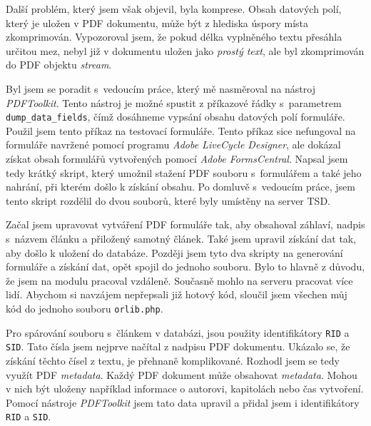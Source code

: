 \documentclass[czech,BP]{thesiskiv}
\begin{document}
Další problém, který jsem však objevil, byla komprese. Obsah datových polí, který je uložen v PDF dokumentu, může být z hlediska úspory místa zkomprimován. Vypozoroval jsem, že pokud délka vyplněného textu přesáhla určitou mez, nebyl již v dokumentu uložen jako \emph{prostý text}, ale byl zkomprimován do PDF objektu \emph{stream}. 

Byl jsem se poradit s~vedoucím práce, který mě nasměroval na nástroj \emph{PDFToolkit}. Tento nástroj je možné spustit z příkazové řádky s~parametrem \texttt{dump\_data\_fields}, čímž dosáhneme vypsání obsahu datových polí formuláře. Použil jsem tento příkaz na testovací formuláře. Tento příkaz sice nefungoval na formuláře navržené pomocí programu \emph{Adobe LiveCycle Designer}, ale dokázal získat obsah formulářů vytvořených pomocí \emph{Adobe FormsCentral}. Napsal jsem tedy krátký skript, který umožnil stažení PDF souboru s~formulářem a také jeho nahrání, při kterém došlo k získání obsahu. Po domluvě s~vedoucím práce, jsem tento skript rozdělil do dvou souborů, které byly umístěny na server TSD. 

Začal jsem upravovat vytváření PDF formuláře tak, aby obsahoval záhlaví, nadpis s~názvem článku a přiložený samotný článek. Také jsem upravil získání dat tak, aby došlo k uložení do databáze. Později jsem tyto dva skripty na generování formuláře a získání dat, opět spojil do jednoho souboru. Bylo to hlavně z důvodu, že jsem na modulu pracoval vzdáleně. Současně mohlo na serveru pracovat více lidí. Abychom si navzájem nepřepsali již hotový kód, sloučil jsem všechen můj kód do jednoho souboru \texttt{orlib.php}. 

Pro spárování souboru s~článkem v databázi, jsou použity identifikátory \texttt{RID} a \texttt{SID}. Tato čísla jsem nejprve načítal z nadpisu PDF dokumentu. Ukázalo se, že získání těchto čísel z textu, je přehnaně komplikované. Rozhodl jsem se tedy využít PDF \emph{metadata}. Každý PDF dokument může obsahovat \emph{metadata}. Mohou v nich být uloženy například informace o autorovi, kapitolách nebo čas vytvoření. Pomocí nástroje \emph{PDFToolkit} jsem tato data upravil a přidal jsem i identifikátory \texttt{RID} a \texttt{SID}.
\end{document}
